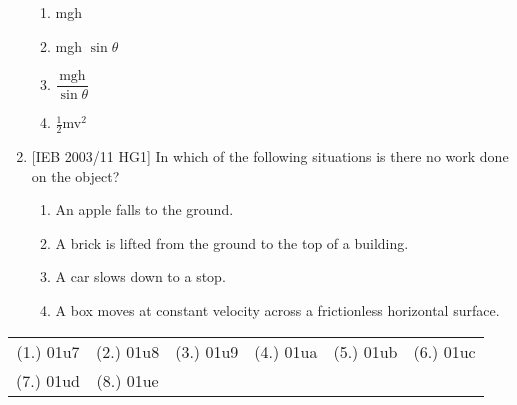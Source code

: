 \begin{eocexercises}{}
\begin{enumerate}
{\begin{enumerate}
\item{mgh}
\item{mgh $\sin \theta$}
\item{$\dfrac{\textrm{mgh}}{\sin \theta}$}
\item{$\tfrac{1}{2}$mv$^2$}
\end{enumerate}}

\item{[IEB 2003/11 HG1] In which of the following situations is there no work done on the object?

\begin{enumerate}
\item{An apple falls to the ground.}
\item{A brick is lifted from the ground to the top of a building.}
\item{A car slows down to a stop.}
\item{A box moves at constant velocity across a frictionless horizontal surface.}
\end{enumerate}
}

\end{enumerate}


\par \practiceinfo
\par \begin{tabular}[h]{cccccc}
(1.)	01u7	&
(2.)	01u8	&
(3.)	01u9	&
(4.)	01ua	&
(5.)	01ub	&
(6.)	01uc	\\ %
(7.)	01ud	&
(8.)	01ue	&
\end{tabular}

\end{eocexercises}





